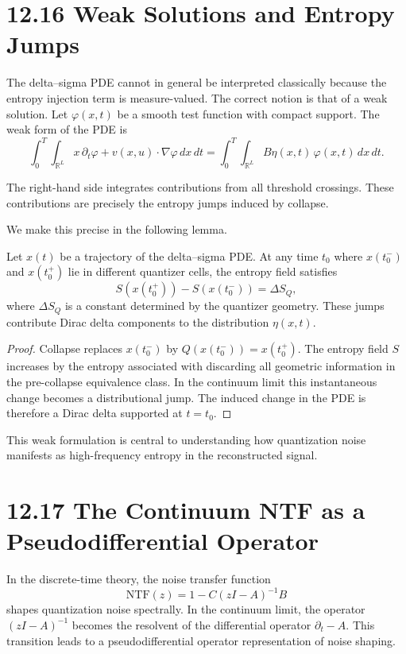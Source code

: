 \section*{12.16 Weak Solutions and Entropy Jumps}

The delta--sigma PDE cannot in general be interpreted classically because the entropy injection term is measure-valued. The correct notion is that of a weak solution. Let $\varphi(x,t)$ be a smooth test function with compact support. The weak form of the PDE is
\[
\int_{0}^{T} \int_{\mathbb{R}^{L}} x \, \partial_{t} \varphi + v(x,u) \cdot \nabla \varphi \, dx \, dt
=
\int_{0}^{T} \int_{\mathbb{R}^{L}} B \eta(x,t) \, \varphi(x,t) \, dx \, dt.
\]

The right-hand side integrates contributions from all threshold crossings. These contributions are precisely the entropy jumps induced by collapse.

We make this precise in the following lemma.

\begin{lemma}
Let $x(t)$ be a trajectory of the delta--sigma PDE. At any time $t_{0}$ where $x(t_{0}^{-})$ and $x(t_{0}^{+})$ lie in different quantizer cells, the entropy field satisfies
\[
S(x(t_{0}^{+})) - S(x(t_{0}^{-})) = \Delta S_{Q},
\]
where $\Delta S_{Q}$ is a constant determined by the quantizer geometry. These jumps contribute Dirac delta components to the distribution $\eta(x,t)$.
\end{lemma}

\begin{proof}
Collapse replaces $x(t_{0}^{-})$ by $Q(x(t_{0}^{-})) = x(t_{0}^{+})$. The entropy field $S$ increases by the entropy associated with discarding all geometric information in the pre-collapse equivalence class. In the continuum limit this instantaneous change becomes a distributional jump. The induced change in the PDE is therefore a Dirac delta supported at $t=t_{0}$.
\end{proof}

This weak formulation is central to understanding how quantization noise manifests as high-frequency entropy in the reconstructed signal.

\section*{12.17 The Continuum NTF as a Pseudodifferential Operator}

In the discrete-time theory, the noise transfer function
\[
\mathrm{NTF}(z) = 1 - C (zI - A)^{-1} B
\]
shapes quantization noise spectrally. In the continuum limit, the operator $(zI - A)^{-1}$ becomes the resolvent of the differential operator $\partial_{t} - A$. This transition leads to a pseudodifferential operator representation of noise shaping.

